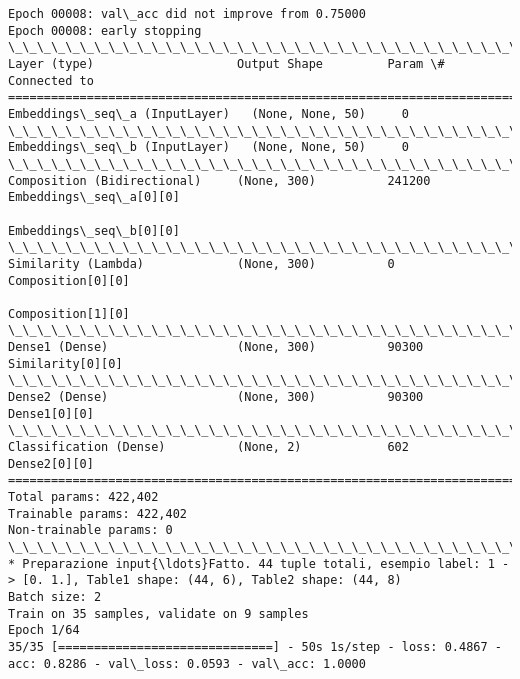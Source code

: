 \documentclass[11pt]{article}
\begin{document}
\begin{Verbatim}[commandchars=\\\{\}]
Epoch 00008: val\_acc did not improve from 0.75000
Epoch 00008: early stopping
\_\_\_\_\_\_\_\_\_\_\_\_\_\_\_\_\_\_\_\_\_\_\_\_\_\_\_\_\_\_\_\_\_\_\_\_\_\_\_\_\_\_\_\_\_\_\_\_\_\_\_\_\_\_\_\_\_\_\_\_\_\_\_\_\_\_\_\_\_\_\_\_\_\_\_\_\_\_\_\_\_\_\_\_\_\_\_\_\_\_\_\_\_\_\_\_\_\_
Layer (type)                    Output Shape         Param \#     Connected to                     
==================================================================================================
Embeddings\_seq\_a (InputLayer)   (None, None, 50)     0                                            
\_\_\_\_\_\_\_\_\_\_\_\_\_\_\_\_\_\_\_\_\_\_\_\_\_\_\_\_\_\_\_\_\_\_\_\_\_\_\_\_\_\_\_\_\_\_\_\_\_\_\_\_\_\_\_\_\_\_\_\_\_\_\_\_\_\_\_\_\_\_\_\_\_\_\_\_\_\_\_\_\_\_\_\_\_\_\_\_\_\_\_\_\_\_\_\_\_\_
Embeddings\_seq\_b (InputLayer)   (None, None, 50)     0                                            
\_\_\_\_\_\_\_\_\_\_\_\_\_\_\_\_\_\_\_\_\_\_\_\_\_\_\_\_\_\_\_\_\_\_\_\_\_\_\_\_\_\_\_\_\_\_\_\_\_\_\_\_\_\_\_\_\_\_\_\_\_\_\_\_\_\_\_\_\_\_\_\_\_\_\_\_\_\_\_\_\_\_\_\_\_\_\_\_\_\_\_\_\_\_\_\_\_\_
Composition (Bidirectional)     (None, 300)          241200      Embeddings\_seq\_a[0][0]           
                                                                 Embeddings\_seq\_b[0][0]           
\_\_\_\_\_\_\_\_\_\_\_\_\_\_\_\_\_\_\_\_\_\_\_\_\_\_\_\_\_\_\_\_\_\_\_\_\_\_\_\_\_\_\_\_\_\_\_\_\_\_\_\_\_\_\_\_\_\_\_\_\_\_\_\_\_\_\_\_\_\_\_\_\_\_\_\_\_\_\_\_\_\_\_\_\_\_\_\_\_\_\_\_\_\_\_\_\_\_
Similarity (Lambda)             (None, 300)          0           Composition[0][0]                
                                                                 Composition[1][0]                
\_\_\_\_\_\_\_\_\_\_\_\_\_\_\_\_\_\_\_\_\_\_\_\_\_\_\_\_\_\_\_\_\_\_\_\_\_\_\_\_\_\_\_\_\_\_\_\_\_\_\_\_\_\_\_\_\_\_\_\_\_\_\_\_\_\_\_\_\_\_\_\_\_\_\_\_\_\_\_\_\_\_\_\_\_\_\_\_\_\_\_\_\_\_\_\_\_\_
Dense1 (Dense)                  (None, 300)          90300       Similarity[0][0]                 
\_\_\_\_\_\_\_\_\_\_\_\_\_\_\_\_\_\_\_\_\_\_\_\_\_\_\_\_\_\_\_\_\_\_\_\_\_\_\_\_\_\_\_\_\_\_\_\_\_\_\_\_\_\_\_\_\_\_\_\_\_\_\_\_\_\_\_\_\_\_\_\_\_\_\_\_\_\_\_\_\_\_\_\_\_\_\_\_\_\_\_\_\_\_\_\_\_\_
Dense2 (Dense)                  (None, 300)          90300       Dense1[0][0]                     
\_\_\_\_\_\_\_\_\_\_\_\_\_\_\_\_\_\_\_\_\_\_\_\_\_\_\_\_\_\_\_\_\_\_\_\_\_\_\_\_\_\_\_\_\_\_\_\_\_\_\_\_\_\_\_\_\_\_\_\_\_\_\_\_\_\_\_\_\_\_\_\_\_\_\_\_\_\_\_\_\_\_\_\_\_\_\_\_\_\_\_\_\_\_\_\_\_\_
Classification (Dense)          (None, 2)            602         Dense2[0][0]                     
==================================================================================================
Total params: 422,402
Trainable params: 422,402
Non-trainable params: 0
\_\_\_\_\_\_\_\_\_\_\_\_\_\_\_\_\_\_\_\_\_\_\_\_\_\_\_\_\_\_\_\_\_\_\_\_\_\_\_\_\_\_\_\_\_\_\_\_\_\_\_\_\_\_\_\_\_\_\_\_\_\_\_\_\_\_\_\_\_\_\_\_\_\_\_\_\_\_\_\_\_\_\_\_\_\_\_\_\_\_\_\_\_\_\_\_\_\_
* Preparazione input{\ldots}Fatto. 44 tuple totali, esempio label: 1 -> [0. 1.], Table1 shape: (44, 6), Table2 shape: (44, 8)
Batch size: 2
Train on 35 samples, validate on 9 samples
Epoch 1/64
35/35 [==============================] - 50s 1s/step - loss: 0.4867 - acc: 0.8286 - val\_loss: 0.0593 - val\_acc: 1.0000


\end{Verbatim}
\end{document}
